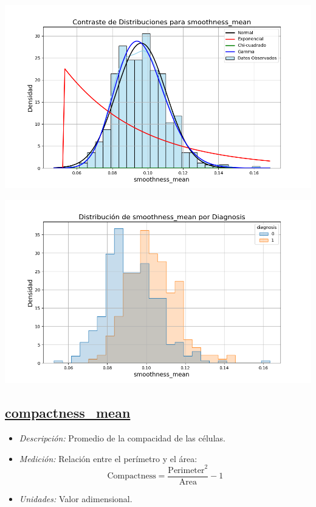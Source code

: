 \documentclass[a4paper, 12pt]{article}
\begin{document}
\includegraphics[width=\textwidth]{../Plots/plots_stats/smoothness_mean/distribuciones_conocidas_smoothness_mean.png}

\includegraphics[width=\textwidth]{../Plots/plots_diagnosis/distribucion_smoothness_mean_por_diagnosis.png}

\subsection*{\underline{compactness\_mean}}
  \begin{itemize}
	\item \textit{Descripción:} Promedio de la compacidad de las células.
	\item \textit{Medición:} Relación entre el perímetro y el área:
	\[
	\text{Compactness} = \frac{\text{Perimeter}^2}{\text{Area}} - 1
	\]
	\item \textit{Unidades:} Valor adimensional.
\end{itemize}
\end{document}
